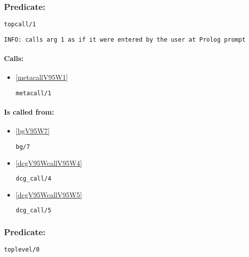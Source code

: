 \subsubsection{Predicate:} \label{topcallV95W1}

\begin{verbatim}
topcall/1
\end{verbatim}

{\small \begin{verbatim}
INFO: calls arg 1 as if it were entered by the user at Prolog prompt

\end{verbatim}}
\paragraph{Calls:} 
\begin{itemize}
\item \ref{metacallV95W1} 
\begin{verbatim}
metacall/1
\end{verbatim}

\end{itemize}
\paragraph{Is called from:} 
\begin{itemize}
\item \ref{bgV95W7} 
\begin{verbatim}
bg/7
\end{verbatim}

\item \ref{dcgV95WcallV95W4} 
\begin{verbatim}
dcg_call/4
\end{verbatim}

\item \ref{dcgV95WcallV95W5} 
\begin{verbatim}
dcg_call/5
\end{verbatim}

\end{itemize}

\subsubsection{Predicate:} \label{toplevelV95W0}

\begin{verbatim}
toplevel/0
\end{verbatim}

